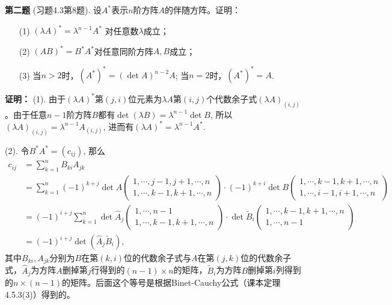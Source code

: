 \fi  %

\newpageorvspace

{\bf 第二题} (习题4.3第8题). 设$A^*$表示$n$阶方阵$A$的伴随方阵。证明：
\begin{itemize}
\item[(1)] $(\lambda A)^* = \lambda^{n-1}A^*$ 对任意数$\lambda$成立；
\item[(2)] $(AB)^* = B^*A^*$对任意同阶方阵$A,B$成立；
\item[(3)] 当$n > 2$时，$(A^*)^* = (\det A)^{n-2}A$; 当$n = 2$时，$(A^*)^* = A$.
\end{itemize}

\ifIncludeAnswer

\newpageorvspace

{\bf 证明：} (1). 由于$(\lambda A)^*$第$(j,i)$位元素为$\lambda A$第$(i,j)$个代数余子式$(\lambda A)_{(i,j)}$。由于任意$n-1$阶方阵$B$都有$\det(\lambda B) = \lambda^{n-1}\det B$, 所以$(\lambda A)_{(i,j)} = \lambda^{n-1} A_{(i,j)}$, 进而有$(\lambda A)^* = \lambda^{n-1}A^*$.

(2). 令$B^*A^* = (c_{ij})$, 那么
\begin{align*}
c_{ij} & = \sum\limits_{k=1}^n B_{ki} A_{jk} \\
& = \sum\limits_{k=1}^n (-1)^{k+j}\det A\begin{pmatrix} 1,\cdots,j-1,j+1,\cdots,n \\ 1,\cdots,k-1,k+1,\cdots,n \end{pmatrix} \cdot (-1)^{k+i} \det B\begin{pmatrix} 1,\cdots,k-1,k+1,\cdots,n \\ 1,\cdots,i-1,i+1,\cdots,n \end{pmatrix} \\
& = (-1)^{i+j} \sum\limits_{k=1}^n \det\widehat{A}_j\begin{pmatrix} 1,\cdots,n-1 \\ 1,\cdots,k-1,k+1,\cdots,n \end{pmatrix} \cdot \det \widetilde{B}_i\begin{pmatrix} 1,\cdots,k-1,k+1,\cdots,n \\ 1,\cdots,n-1 \end{pmatrix} \\
& = (-1)^{i+j} \det(\widehat{A}_j \widetilde{B}_i),
\end{align*}
其中$B_{ki}, A_{jk}$分别为$B$在第$(k,i)$位的代数余子式与$A$在第$(j,k)$位的代数余子式，$\widehat{A}_j$为方阵$A$删掉第$j$行得到的$(n-1)\times n$的矩阵，$\widetilde{B}_i$为方阵$B$删掉第$i$列得到的$n\times (n-1)$的矩阵。后面这个等号是根据Binet-Cauchy公式（课本定理4.5.3(3)）得到的。

